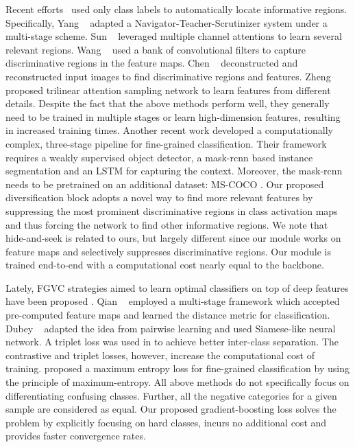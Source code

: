 \documentclass[letterpaper]{article} \usepackage{aaai20}  \usepackage{times}  \usepackage{helvet} \usepackage{courier}  \usepackage[hyphens]{url}  \usepackage{graphicx} \usepackage{multirow}
\begin{document}
Recent efforts~\cite{nts_2018,mamc_2018,Chen_2019_CVPR,zheng2019looking,ge2019weakly} used only class labels to automatically locate informative regions. 
Specifically, Yang \etal ~\cite{nts_2018} adapted a Navigator-Teacher-Scrutinizer system under a multi-stage scheme. Sun \etal ~\cite{mamc_2018} leveraged multiple channel attentions to learn several relevant regions. Wang \etal ~\cite{DFL_cnn_2018} used a bank of convolutional filters to capture discriminative regions in the feature maps.
Chen ~\cite{Chen_2019_CVPR} deconstructed and reconstructed input images to find discriminative regions and features. Zheng \etal ~\cite{zheng2019looking} proposed trilinear attention sampling network to learn features from different details. 
Despite the fact that the above methods perform well, they generally need to be trained in multiple stages or learn high-dimension features, resulting in increased training times. Another recent work \cite{ge2019weakly} developed a computationally complex, three-stage pipeline for fine-grained classification. Their framework requires a weakly supervised object detector, a mask-rcnn \cite{maskrcnn} based instance segmentation and an LSTM for capturing the context. Moreover, the mask-rcnn needs to be pretrained on an additional dataset: MS-COCO \cite{coco_eccv2014}. 
Our proposed diversification block adopts a novel way to find more relevant features by suppressing the most prominent discriminative regions in class activation maps  \cite{CAMs} and thus forcing the network to find other informative regions. We note that hide-and-seek \cite{has_2017} is related to ours, but largely different since our module works on feature maps and selectively suppresses discriminative regions. Our module is trained end-to-end with a computational cost nearly equal to the backbone.

Lately, FGVC strategies aimed to learn optimal classifiers on top of deep features have been proposed \cite{pc_2018,max_entropy}. Qian \etal~\cite{qian2015fine} employed a multi-stage framework which accepted pre-computed feature maps and learned the distance metric for classification.   Dubey \etal~ \cite{pc_2018} adapted the idea from pairwise learning and used Siamese-like neural network. 
A triplet loss was used in \cite{wang2016mining} to achieve better inter-class separation. The contrastive and triplet losses, however, increase the computational cost of training. \cite{max_entropy} proposed a maximum entropy loss for fine-grained classification by using the principle of maximum-entropy. All above methods do not specifically focus on differentiating confusing classes. Further, all the negative categories for a given sample are considered as equal. Our proposed gradient-boosting loss solves the problem by explicitly focusing on hard classes, incurs no additional cost and provides faster convergence rates.
\end{document}
